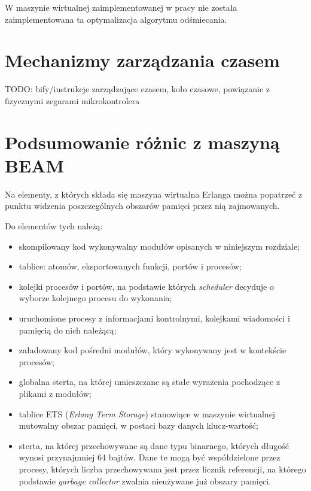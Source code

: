 W maszynie wirtualnej zaimplementowanej w pracy nie została zaimplementowana ta optymalizacja algorytmu odśmiecania. 


\section{Mechanizmy zarządzania czasem}
\label{sec:maszynaTimer}

TODO: bify/instrukcje zarządzające czasem, koło czasowe, powiązanie z fizycznymi zegarami mikrokontrolera 

\section{Podsumowanie różnic z maszyną BEAM}
\label{sec:maszynaPodsumowanie}

Na elementy, z których składa się maszyna wirtualna Erlanga można popatrzeć z punktu widzenia poszczególnych obszarów pamięci przez nią zajmowanych.

Do elementów tych należą:
\begin{itemize}
\item skompilowany kod wykonywalny modułów opisanych w niniejszym rozdziale;
\item tablice: atomów, eksportowanych funkcji, portów i procesów;
\item kolejki procesów i portów, na podstawie których \emph{scheduler} decyduje o wyborze kolejnego procesu do wykonania;
\item uruchomione procesy z informacjami kontrolnymi, kolejkami wiadomości i pamięcią do nich należącą;
\item załadowany kod pośredni modułów, który wykonywany jest w kontekście procesów;
\item globalna sterta, na której umieszczane są stałe wyrażenia pochodzące z plikami z modułów;
\item tablice ETS (\emph{Erlang Term Storage}) stanowiące w maszynie wirtualnej mutowalny obszar pamięci, w postaci bazy danych klucz-wartość;
\item sterta, na której przechowywane są dane typu binarnego, których długość wynosi przynajmniej 64 bajtów. Dane te mogą być współdzielone przez procesy, których liczba przechowywana jest przez licznik referencji, na którego podstawie \emph{garbage collector} zwalnia nieużywane już obszary pamięci.
\end{itemize}

